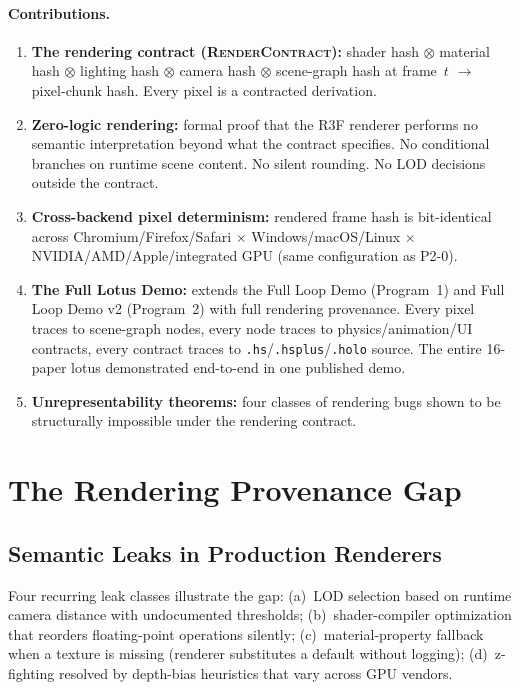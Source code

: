 \documentclass[sigconf,nonacm]{acmart}
\newcommand{\rendercontract}{\textsc{RenderContract}}
\newcommand{\tropmult}{\otimes}
\begin{document}
\paragraph{Contributions.}
\begin{enumerate}
  \item \textbf{The rendering contract (\rendercontract{}):}
    shader hash $\tropmult$ material hash $\tropmult$ lighting
    hash $\tropmult$ camera hash $\tropmult$ scene-graph hash at
    frame~$t$ $\to$ pixel-chunk hash. Every pixel is a contracted
    derivation.
  \item \textbf{Zero-logic rendering:} formal proof that the R3F
    renderer performs no semantic interpretation beyond what the
    contract specifies. No conditional branches on runtime scene
    content. No silent rounding. No LOD decisions outside the
    contract.
  \item \textbf{Cross-backend pixel determinism:} rendered frame
    hash is bit-identical across Chromium/Firefox/Safari $\times$
    Windows/macOS/Linux $\times$ NVIDIA/AMD/Apple/integrated GPU
    (same configuration as P2-0).
  \item \textbf{The Full Lotus Demo:} extends the Full Loop Demo
    (Program~1) and Full Loop Demo v2 (Program~2) with full
    rendering provenance. Every pixel traces to scene-graph nodes,
    every node traces to physics/animation/UI contracts, every
    contract traces to \texttt{.hs}/\texttt{.hsplus}/\texttt{.holo}
    source. The entire 16-paper lotus demonstrated end-to-end in
    one published demo.
  \item \textbf{Unrepresentability theorems:} four classes of
    rendering bugs shown to be structurally impossible under the
    rendering contract.
\end{enumerate}

\section{The Rendering Provenance Gap}
\label{sec:gap}

\subsection{Semantic Leaks in Production Renderers}
Four recurring leak classes illustrate the gap: (a)~LOD selection based on
runtime camera distance with undocumented thresholds; (b)~shader-compiler
optimization that reorders floating-point operations silently;
(c)~material-property fallback when a texture is missing (renderer substitutes
a default without logging); (d)~z-fighting resolved by depth-bias heuristics
that vary across GPU vendors.
\end{document}
